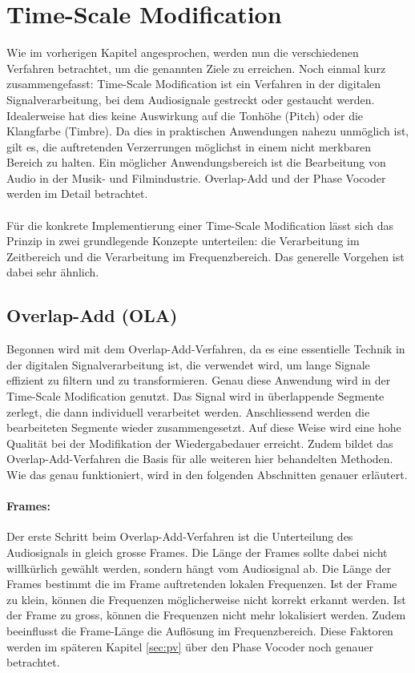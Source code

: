\section{Time-Scale Modification}
\label{sec:tsm}
Wie im vorherigen Kapitel angesprochen, werden nun die verschiedenen Verfahren betrachtet, um die genannten Ziele zu erreichen. Noch einmal kurz zusammengefasst: Time-Scale Modification ist ein Verfahren in der digitalen Signalverarbeitung, bei dem Audiosignale gestreckt oder gestaucht werden. Idealerweise hat dies keine Auswirkung auf die Tonhöhe (Pitch) oder die Klangfarbe (Timbre). Da dies in praktischen Anwendungen nahezu unmöglich ist, gilt es, die auftretenden Verzerrungen möglichst in einem nicht merkbaren Bereich zu halten. Ein möglicher Anwendungsbereich ist die Bearbeitung von Audio in der Musik- und Filmindustrie. Overlap-Add und der Phase Vocoder werden im Detail betrachtet.

\paragraph{}
Für die konkrete Implementierung einer Time-Scale Modification lässt sich das Prinzip in zwei grundlegende Konzepte unterteilen: die Verarbeitung im Zeitbereich und die Verarbeitung im Frequenzbereich. Das generelle Vorgehen ist dabei sehr ähnlich.

\subsection{Overlap-Add (OLA)}
\label{sec:ola}
Begonnen wird mit dem Overlap-Add-Verfahren, da es eine essentielle Technik in der digitalen Signalverarbeitung ist, die verwendet wird, um lange Signale effizient zu filtern und zu transformieren. Genau diese Anwendung wird in der Time-Scale Modification genutzt. Das Signal wird in überlappende Segmente zerlegt, die dann individuell verarbeitet werden. Anschliessend werden die bearbeiteten Segmente wieder zusammengesetzt. Auf diese Weise wird eine hohe Qualität bei der Modifikation der Wiedergabedauer erreicht. Zudem bildet das Overlap-Add-Verfahren die Basis für alle weiteren hier behandelten Methoden. Wie das genau funktioniert, wird in den folgenden Abschnitten genauer erläutert.

\paragraph{Frames:}
Der erste Schritt beim Overlap-Add-Verfahren ist die Unterteilung des Audiosignals in gleich grosse Frames. Die Länge der Frames sollte dabei nicht willkürlich gewählt werden, sondern hängt vom Audiosignal ab. Die Länge der Frames bestimmt die im Frame auftretenden lokalen Frequenzen. Ist der Frame zu klein, können die Frequenzen möglicherweise nicht korrekt erkannt werden. Ist der Frame zu gross, können die Frequenzen nicht mehr lokalisiert werden. Zudem beeinflusst die Frame-Länge die Auflösung im Frequenzbereich. Diese Faktoren werden im späteren Kapitel \ref{sec:pv} über den Phase Vocoder noch genauer betrachtet.

